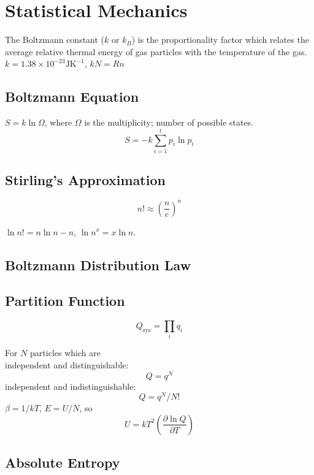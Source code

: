 \section{Statistical Mechanics}
The Boltzmann constant ($k$ or $k_B$) is the proportionality factor which relates the average relative thermal energy 
of gas particles with the temperature of the gas.
$k = 1.38 \times 10^{-23} \mathrm{J} \mathrm{K}^{-1}$, $kN = Rn$

\subsection*{Boltzmann Equation}
$S = k \ln \Omega$, where $\Omega$ is the multiplicity; number of possible states.
\begin{equation*}
    S = -k \sum_{i = 1}^{t}p_i \ln p_i
\end{equation*}

\subsection*{Stirling's Approximation}
\begin{equation*}
    n! \approx \left(\frac{n}{e}\right)^n
\end{equation*}

$\ln n! = n \ln n - n$, $\ln n^x = x \ln n$.

\subsection*{Boltzmann Distribution Law}

\subsection*{Partition Function}
\begin{equation*}
    Q_{\mathrm{sys}} = \prod_{i} q_i
\end{equation*}

For $N$ particles which are \\
independent and distinguishable: $$Q = q^N$$independent and indistinguishable: $$Q = q^N/N!$$
$\beta = 1/kT$, $E = U/N$, so $$U = kT^2\left(\frac{\partial \ln Q}{\partial T}\right)$$

\subsection*{Absolute Entropy}